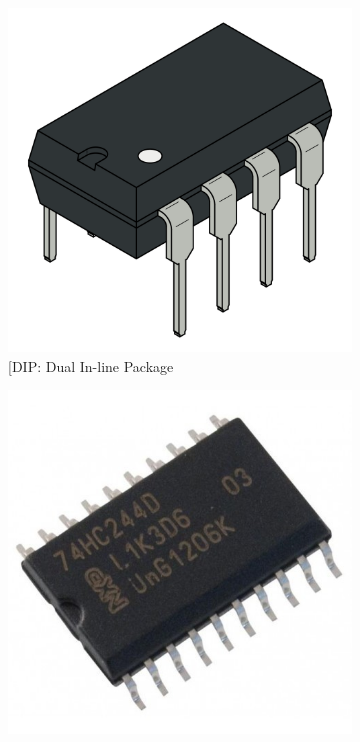 \documentclass[
]{book}
\begin{document}
\begin{figure}[H]
\centering
  \begin{subfigure}[b]{0.2\textwidth}
    \includegraphics[width=\textwidth]{immagini/30.png}
    \caption{[DIP: Dual In-line Package}
  \end{subfigure}
  \hspace{0.02\textwidth}
  \begin{subfigure}[b]{0.2\textwidth}
    \includegraphics[width=\textwidth]{immagini/31.jpg}

\end{subfigure}
\end{figure}
\end{document}

